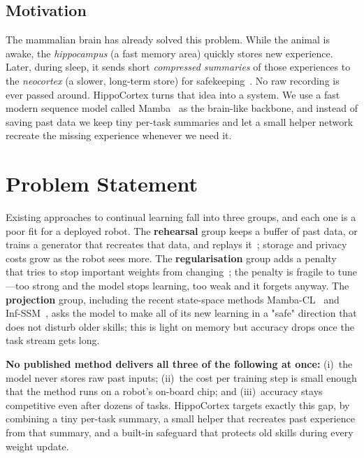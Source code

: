 \documentclass[11pt,a4paper]{article}
\begin{document}
\subsection{Motivation}
The mammalian brain has already solved this problem. While the animal is awake, the \emph{hippocampus} (a fast memory area) quickly stores new experience. Later, during sleep, it sends short \emph{compressed summaries} of those experiences to the \emph{neocortex} (a slower, long-term store) for safekeeping~\citep{buzsaki2015hippocampal,mcclelland1995complementary}. No raw recording is ever passed around. HippoCortex turns that idea into a system. We use a fast modern sequence model called Mamba~\citep{gu2023mamba} as the brain-like backbone, and instead of saving past data we keep tiny per-task summaries and let a small helper network recreate the missing experience whenever we need it.

\section{Problem Statement}

Existing approaches to continual learning fall into three groups, and each one is a poor fit for a deployed robot. The \textbf{rehearsal} group keeps a buffer of past data, or trains a generator that recreates that data, and replays it~\citep{rebuffi2017icarl,shin2017continual}; storage and privacy costs grow as the robot sees more. The \textbf{regularisation} group adds a penalty that tries to stop important weights from changing~\citep{kirkpatrick2017overcoming}; the penalty is fragile to tune---too strong and the model stops learning, too weak and it forgets anyway. The \textbf{projection} group, including the recent state-space methods Mamba-CL~\citep{cheng2024mambacl} and Inf-SSM~\citep{lee2025exemplarfree}, asks the model to make all of its new learning in a "safe" direction that does not disturb older skills; this is light on memory but accuracy drops once the task stream gets long.

\textbf{No published method delivers all three of the following at once:} (i)~the model never stores raw past inputs; (ii)~the cost per training step is small enough that the method runs on a robot's on-board chip; and (iii)~accuracy stays competitive even after dozens of tasks. HippoCortex targets exactly this gap, by combining a tiny per-task summary, a small helper that recreates past experience from that summary, and a built-in safeguard that protects old skills during every weight update.
\end{document}

